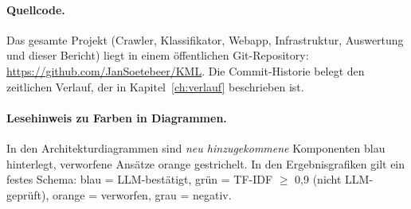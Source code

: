 \paragraph{Quellcode.} Das gesamte Projekt (Crawler, Klassifikator, Webapp, Infrastruktur, Auswertung und dieser Bericht) liegt in einem öffentlichen Git-Repository: \url{https://github.com/JanSoetebeer/KML}. Die Commit-Historie belegt den zeitlichen Verlauf, der in Kapitel~\ref{ch:verlauf} beschrieben ist.

\paragraph{Lesehinweis zu Farben in Diagrammen.} In den Architekturdiagrammen sind \emph{neu hinzugekommene} Komponenten blau hinterlegt, verworfene Ansätze orange gestrichelt. In den Ergebnisgrafiken gilt ein festes Schema: blau = LLM-bestätigt, grün = TF-IDF $\ge$ 0,9 (nicht LLM-geprüft), orange = verworfen, grau = negativ.

